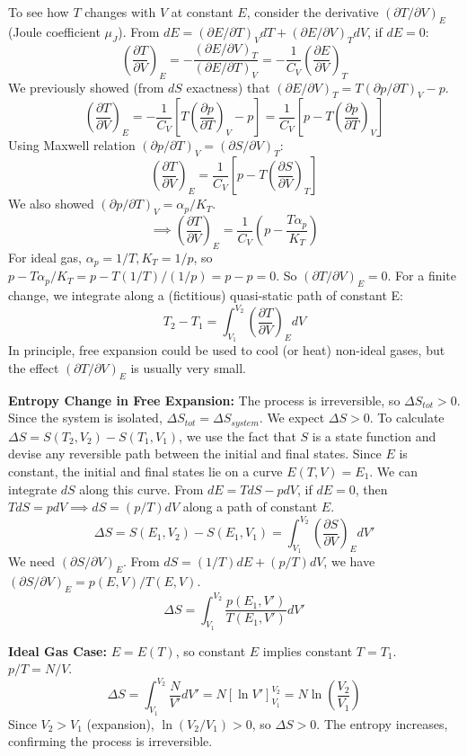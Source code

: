 \documentclass[11pt]{article}
\newcommand{\pderiv}[2]{\frac{\partial #1}{\partial #2}}
\begin{document}
To see how $T$ changes with $V$ at constant $E$, consider the derivative $(\partial T / \partial V)_E$ (Joule coefficient $\mu_J$).
From $dE = (\partial E/\partial T)_V dT + (\partial E/\partial V)_T dV$, if $dE=0$:
\[ \left( \pderiv{T}{V} \right)_E = - \frac{(\partial E / \partial V)_T}{(\partial E / \partial T)_V} = -\frac{1}{C_V} \left( \pderiv{E}{V} \right)_T \]
We previously showed (from $dS$ exactness) that $(\partial E / \partial V)_T = T (\partial p / \partial T)_V - p$.
\[ \left( \pderiv{T}{V} \right)_E = -\frac{1}{C_V} \left[ T \left( \pderiv{p}{T} \right)_V - p \right] = \frac{1}{C_V} \left[ p - T \left( \pderiv{p}{T} \right)_V \right] \]
Using Maxwell relation $(\partial p/\partial T)_V = (\partial S/\partial V)_T$:
\[ \left( \pderiv{T}{V} \right)_E = \frac{1}{C_V} \left[ p - T \left( \pderiv{S}{V} \right)_T \right] \]
We also showed $(\partial p / \partial T)_V = \alpha_p / K_T$.
\[ \implies \left( \pderiv{T}{V} \right)_E = \frac{1}{C_V} \left( p - \frac{T \alpha_p}{K_T} \right) \]
For ideal gas, $\alpha_p=1/T, K_T=1/p$, so $p - T\alpha_p/K_T = p - T(1/T)/(1/p) = p - p = 0$. So $(\partial T/\partial V)_E=0$.
For a finite change, we integrate along a (fictitious) quasi-static path of constant E:
\[ T_2 - T_1 = \int_{V_1}^{V_2} \left( \pderiv{T}{V} \right)_E dV \]
In principle, free expansion could be used to cool (or heat) non-ideal gases, but the effect $(\partial T/\partial V)_E$ is usually very small.

\textbf{Entropy Change in Free Expansion:}
The process is irreversible, so $\Delta S_{tot} > 0$. Since the system is isolated, $\Delta S_{tot} = \Delta S_{system}$. We expect $\Delta S > 0$.
To calculate $\Delta S = S(T_2, V_2) - S(T_1, V_1)$, we use the fact that $S$ is a state function and devise any reversible path between the initial and final states. Since $E$ is constant, the initial and final states lie on a curve $E(T,V)=E_1$. We can integrate $dS$ along this curve.
From $dE = T dS - p dV$, if $dE=0$, then $T dS = p dV \implies dS = (p/T) dV$ along a path of constant $E$.
\[ \Delta S = S(E_1, V_2) - S(E_1, V_1) = \int_{V_1}^{V_2} \left( \pderiv{S}{V} \right)_E dV' \]
We need $(\partial S/\partial V)_E$. From $dS = (1/T)dE + (p/T)dV$, we have $(\partial S/\partial V)_E = p(E,V)/T(E,V)$.
\[ \Delta S = \int_{V_1}^{V_2} \frac{p(E_1, V')}{T(E_1, V')} dV' \]

\textbf{Ideal Gas Case:} $E=E(T)$, so constant $E$ implies constant $T=T_1$. $p/T = N/V$.
\[ \Delta S = \int_{V_1}^{V_2} \frac{N}{V'} dV' = N [\ln V']_{V_1}^{V_2} = N \ln \left( \frac{V_2}{V_1} \right) \]
Since $V_2 > V_1$ (expansion), $\ln(V_2/V_1) > 0$, so $\Delta S > 0$. The entropy increases, confirming the process is irreversible.
\end{document}
